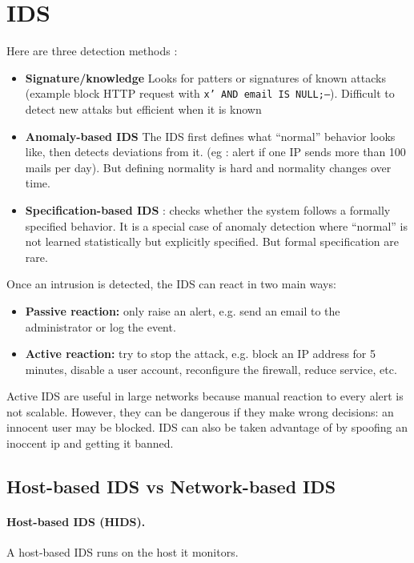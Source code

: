 \section{IDS}
Here are three detection methods : 
\begin{itemize}
    \item \textbf{Signature/knowledge} Looks for patters or signatures of known attacks (example block HTTP request with \texttt{x' AND email IS NULL;--}). Difficult to detect new attaks but efficient when it is known
    \item \textbf{Anomaly-based IDS} The IDS first defines what ``normal'' behavior looks like, then detects deviations from it. (eg : alert if one IP sends more than 100 mails per day). But defining normality is hard and normality changes over time.
    \item \textbf{Specification-based IDS} : checks whether the system follows a formally specified behavior. It is a special case of anomaly detection where ``normal'' is not learned statistically but explicitly specified. But formal specification are rare.

\end{itemize}

Once an intrusion is detected, the IDS can react in two main ways:

\begin{itemize}
    \item \textbf{Passive reaction:} only raise an alert, e.g. send an email to the administrator or log the event.
    \item \textbf{Active reaction:} try to stop the attack, e.g. block an IP address for 5 minutes, disable a user account, reconfigure the firewall, reduce service, etc.
\end{itemize}

Active IDS are useful in large networks because manual reaction to every alert is not scalable. However, they can be dangerous if they make wrong decisions: an innocent user may be blocked. IDS can also be taken advantage of by spoofing an inoccent ip and getting it banned.

\subsection{Host-based IDS vs Network-based IDS}
\paragraph{Host-based IDS (HIDS).}
A host-based IDS runs on the host it monitors.

